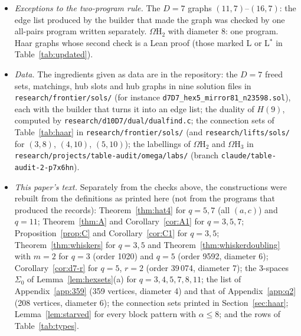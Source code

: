 \documentclass[11pt]{amsart}
\theoremstyle{definition}
\theoremstyle{remark}
\numberwithin{equation}{section}
\newcommand{\Om}{\Omega\mathrm H}
\begin{document}
\begin{itemize}
  group from scratch, including the finite field and the matrix group), or by one program and a Lean proof; twelve of them (up
  to 540\,360 vertices) also passed the all-pairs check. Negative controls (one generator altered, or $D$ lowered by
  one) are rejected.
\item \emph{Exceptions to the two-program rule.} The $D=7$ graphs $(11,7)$--$(16,7)$: the edge list produced by the builder
  that made the graph was checked by one all-pairs program written separately. $\Om_2$ with diameter 8: one program. Haar
  graphs whose second check is a Lean proof (those marked \textsf L or \textsf L$^*$ in Table~\ref{tab:updated}).
\item \emph{Data.} The ingredients given as data are in the repository: the $D=7$ freed sets, matchings, hub slots and hub
  graphs in nine solution files in \nolinkurl{research/frontier/sols/} (for instance \nolinkurl{d7D7_hex5_mirror81_n23598.sol}),
  each with the builder that turns it into an edge list; the duality of $H(9)$, computed by
  \nolinkurl{research/d10D7/dual/dualfind.c}; the connection sets of Table~\ref{tab:haar} in
  \nolinkurl{research/frontier/sols/} (and \nolinkurl{research/lifts/sols/} for $(3,8)$, $(4,10)$, $(5,10)$); the labellings of
  $\Om_2$ and $\Om_3$ in \nolinkurl{research/projects/table-audit/omega/labs/} (branch \nolinkurl{claude/table-audit-2-p7x6hn}).
\item \emph{This paper's text.} Separately from the checks above, the constructions were rebuilt from the definitions as
  printed here (not from the programs that produced the records): Theorem~\ref{thm:hat4} for $q=5,7$ (all $(a,c)$) and
  $q=11$; Theorem~\ref{thm:A} and Corollary~\ref{cor:A1} for $q=3,5,7$; Proposition~\ref{prop:C} and Corollary~\ref{cor:C1}
  for $q=3,5$; Theorem~\ref{thm:whiskers} for $q=3,5$ and Theorem~\ref{thm:whiskerdoubling} with $m=2$ for $q=3$ (order
  1020) and $q=5$ (order 9592, diameter 6); Corollary~\ref{cor:d7-r} for $q=5$, $r=2$ (order 39\,074, diameter 7); the 3-spaces $\Sigma_0$ of
  Lemma~\ref{lem:hexsets}(a) for $q=3,4,5,7,8,11$; the list of Appendix~\ref{app:359} (359 vertices, diameter 4) and that of
  Appendix~\ref{app:q2} (208 vertices, diameter 6); the connection sets printed in Section~\ref{sec:haar}; Lemma~\ref{lem:starved}
  for every block pattern with $\alpha\le8$; and the rows of Table~\ref{tab:types}.
\end{itemize}

\end{document}
